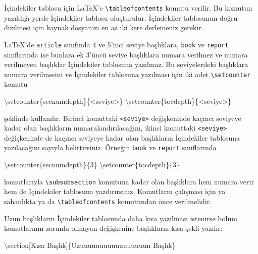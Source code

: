 \documentclass[
  letterpaper,
  DIV=11,
  numbers=noendperiod]{scrreprt}
\newenvironment{Shaded}{\begin{snugshade}}{\end{snugshade}}
\newcommand{\FunctionTok}[1]{\textcolor[rgb]{0.28,0.35,0.67}{#1}}
\newcommand{\KeywordTok}[1]{\textcolor[rgb]{0.00,0.23,0.31}{#1}}
\newcommand{\NormalTok}[1]{\textcolor[rgb]{0.00,0.23,0.31}{#1}}
\begin{document}
İçindekiler tablosu için {\LaTeX}'e
\texttt{\textbackslash{}tableofcontents} komutu verilir. Bu komutun
yazıldığı yerde İçindekiler tablosu oluşturulur. İçindekiler tablosunun
doğru dizilmesi için kaynak dosyanızı en az iki kere derlemeniz gerekir.

{\LaTeX}'de \texttt{article} sınıfında 4 ve 5'inci seviye başlıklara,
\texttt{book} ve \texttt{report} sınıflarında ise bunlara ek 3'üncü
seviye başlıklara numara verilmez ve numara verilmeyen başlıklar
İçindekiler tablosuna yazılmaz. Bu seviyelerdeki başlıklara numara
verilmesini ve İçindekiler tablosuna yazılması için iki adet
\texttt{\textbackslash{}setcounter} komutu

\begin{Shaded}
\begin{Highlighting}[]
\FunctionTok{\textbackslash{}setcounter}\NormalTok{\{secnumdepth\}\{\textless{}seviye\textgreater{}\}}
\FunctionTok{\textbackslash{}setcounter}\NormalTok{\{tocdepth\}\{\textless{}seviye\textgreater{}\}}
\end{Highlighting}
\end{Shaded}

şeklinde kullanılır. Birinci komuttaki
\texttt{\textless{}seviye\textgreater{}} değişkeninde kaçıncı seviyeye
kadar olan başlıkların numaralandırılacağını, ikinci komuttaki
\texttt{\textless{}seviye\textgreater{}} değişkeninde de kaçıncı
seviyeye kadar olan başlıkların İçindekiler tablosuna yazılacağını
sayıyla belirtirsiniz. Örneğin \texttt{book} ve \texttt{report}
sınıflarında

\begin{Shaded}
\begin{Highlighting}[]
\FunctionTok{\textbackslash{}setcounter}\NormalTok{\{secnumdepth\}\{3\}}
\FunctionTok{\textbackslash{}setcounter}\NormalTok{\{tocdepth\}\{3\}}
\end{Highlighting}
\end{Shaded}

komutlarıyla \texttt{\textbackslash{}subsubsection} komutuna kadar olan
başlıklara hem numara verir hem de İçindekiler tablosuna yazdırırsınız.
Komutların çalışması için ya sahanlıkta ya da
\texttt{\textbackslash{}tableofcontents} komutundan önce verilmelidir.

Uzun başlıkların İçindekiler tablosunda daha kısa yazılması istenirse
bölüm komutlarının zorunlu olmayan değişkenine başlıkların kısa şekli
yazılır:

\begin{Shaded}
\begin{Highlighting}[]
\KeywordTok{\textbackslash{}section}\NormalTok{[Kısa Başlık]\{Uzuuuuuuuuuuuuuuuuun Başlık\}}
\end{Highlighting}
\end{Shaded}
\end{document}
